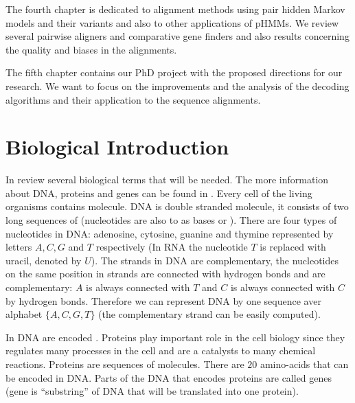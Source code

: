 The fourth chapter is dedicated to alignment methods  using pair hidden Markov
models and their variants and also to other applications of pHMMs. We review
several pairwise aligners and comparative gene finders and also results
concerning the quality and biases in the alignments.

The fifth chapter contains our PhD project with the proposed directions for our
research. We want to focus on the improvements and the analysis of the decoding
algorithms and their application to the sequence alignments. 

\section{Biological Introduction}



In review several biological terms that will be needed. The more information
about DNA, proteins and genes can be found in
\cite{BiologyForDummies,UnderstandingBioinformatics}.
Every cell of the living organisms contains  molecule. DNA is
double stranded molecule, it consists of two long sequences of
 (nucleotides are also  to as bases
or ). There are four types of nucleotides in DNA:
adenosine, cytosine, guanine and thymine represented by letters $A,C,G$ and $T$
respectively (In RNA the nucleotide $T$ is replaced with uracil, denoted by
$U$). The strands in DNA are complementary, the nucleotides on the same position
in strands are connected with hydrogen bonds and are complementary: $A$ is
always connected with $T$ and $C$ is always connected with $C$ by hydrogen
bonds. Therefore we can represent DNA by one sequence aver alphabet
$\{A,C,G,T\}$ (the complementary strand can be easily computed).

In DNA are encoded . Proteins play important role in the
cell biology since  they regulates many processes in the cell and are a
catalysts to many chemical reactions. Proteins are sequences of
 molecules. There are $20$ amino-acids that can be
encoded in DNA. Parts of the DNA that encodes proteins are called genes (gene
is ``substring'' of DNA that will be translated into one protein).

